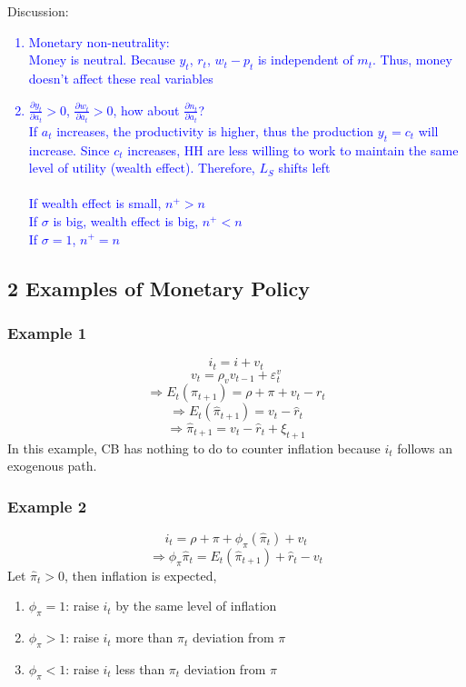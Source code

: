 \documentclass{article}
\begin{document}
{\color{blue}Discussion}:
\textcolor{blue}{
\begin{enumerate}
    \item Monetary non-neutrality:\\
    Money is neutral. Because $y_t$, $r_t$, $w_t - p_t$ is independent of $m_t$. Thus, money doesn't affect these real variables
    \item \textcolor{blue}{$\frac{\partial y_t}{\partial a_t} > 0$, $\frac{\partial w_t}{\partial a_t} > 0$, how about $\frac{\partial n_t}{\partial a_t}$?\\
    If $a_t$ increases, the productivity is higher, thus the production $y_t = c_t$ will increase. Since $c_t$ increases, HH are less willing to work to maintain the same level of utility (wealth effect). Therefore, $L_S$ shifts left\\
    \\
    If wealth effect is small, $n^+ > n$\\
    If $\sigma$ is big, wealth effect is big, $n^+ < n$\\
        If $\sigma = 1$, $n^+ = n$}\\
\end{enumerate}}

\subsection{2 Examples of Monetary Policy}
\subsubsection{Example 1}
$$i_t = i + v_t$$
$$v_t = \rho_v v_{t-1} + \varepsilon_t^v$$
$$\Rightarrow E_t(\pi_{t+1}) = \rho + \pi + v_t - r_t$$
$$\Rightarrow E_t(\hat{\pi}_{t+1}) = v_t - \hat{r}_t$$
$$\Rightarrow \hat{\pi}_{t+1} = v_t - \hat{r}_t + \xi_{t+1}$$
In this example, CB has nothing to do to counter inflation because $i_t$ follows an exogenous path.

\subsubsection{Example 2}
$$i_t = \rho + \pi + \phi_\pi (\hat{\pi}_t) + v_t$$
$$\Rightarrow \phi_\pi \hat{\pi}_t = E_t(\hat{\pi}_{t+1}) + \hat{r}_t - v_t$$
Let $\hat{\pi}_t > 0$, then inflation is expected, 
\begin{enumerate}
    \item $\phi_\pi = 1$: raise $i_t$ by the same level of inflation
    \item $\phi_\pi > 1$: raise $i_t$ more than $\pi_t$ deviation from $\pi$
    \item $\phi_\pi < 1$: raise $i_t$ less than $\pi_t$ deviation from $\pi$
\end{enumerate}
\end{document}
